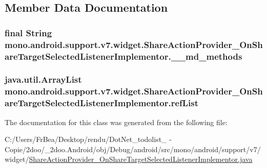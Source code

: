 \subsection{Member Data Documentation}
\hypertarget{classmono_1_1android_1_1support_1_1v7_1_1widget_1_1_share_action_provider___on_share_target_selected_listener_implementor_32a6cc09bf050bf79d6e842469167e17}{
\subsubsection[{\_\-\_\-md\_\-methods}]{\setlength{\rightskip}{0pt plus 5cm}final String {\bf mono.android.support.v7.widget.ShareActionProvider\_\-OnShareTargetSelectedListenerImplementor.\_\-\_\-md\_\-methods}}}
\label{classmono_1_1android_1_1support_1_1v7_1_1widget_1_1_share_action_provider___on_share_target_selected_listener_implementor_32a6cc09bf050bf79d6e842469167e17}


\hypertarget{classmono_1_1android_1_1support_1_1v7_1_1widget_1_1_share_action_provider___on_share_target_selected_listener_implementor_7dc2c6a86e2c9e516159aa06686c618c}{
\subsubsection[{refList}]{\setlength{\rightskip}{0pt plus 5cm}java.util.ArrayList {\bf mono.android.support.v7.widget.ShareActionProvider\_\-OnShareTargetSelectedListenerImplementor.refList}}}
\label{classmono_1_1android_1_1support_1_1v7_1_1widget_1_1_share_action_provider___on_share_target_selected_listener_implementor_7dc2c6a86e2c9e516159aa06686c618c}




The documentation for this class was generated from the following file:\begin{CompactItemize}
\item 
C:/Users/FrBea/Desktop/rendu/DotNet\_\-todolist\_ - Copie/2doo/\_\-2doo.Android/obj/Debug/android/src/mono/android/support/v7/widget/\hyperlink{_share_action_provider___on_share_target_selected_listener_implementor_8java}{ShareActionProvider\_\-OnShareTargetSelectedListenerImplementor.java}\end{CompactItemize}

